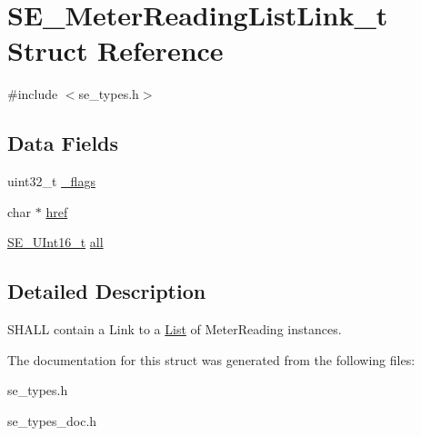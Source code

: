 \hypertarget{structSE__MeterReadingListLink__t}{}\section{S\+E\+\_\+\+Meter\+Reading\+List\+Link\+\_\+t Struct Reference}
\label{structSE__MeterReadingListLink__t}


{\ttfamily \#include $<$se\+\_\+types.\+h$>$}

\subsection*{Data Fields}
\begin{DoxyCompactItemize}
\item 
uint32\+\_\+t \hyperlink{group__MeterReadingListLink_ga1272652a9d058acde8f3dcecf383693c}{\+\_\+flags}
\item 
char $\ast$ \hyperlink{group__MeterReadingListLink_ga319b0a4be54e74724d6291cf2c043050}{href}
\item 
\hyperlink{group__UInt16_gac68d541f189538bfd30cfaa712d20d29}{S\+E\+\_\+\+U\+Int16\+\_\+t} \hyperlink{group__MeterReadingListLink_gaa08693c64dd99f9871b9eb4e6bf45503}{all}
\end{DoxyCompactItemize}


\subsection{Detailed Description}
S\+H\+A\+LL contain a Link to a \hyperlink{structList}{List} of Meter\+Reading instances. 

The documentation for this struct was generated from the following files\+:\begin{DoxyCompactItemize}
\item 
se\+\_\+types.\+h\item 
se\+\_\+types\+\_\+doc.\+h\end{DoxyCompactItemize}
